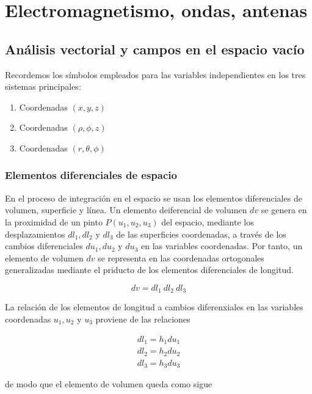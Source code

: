 \chapter{Electromagnetismo, ondas, antenas}

\section{Análisis vectorial y campos en el espacio vacío}

Recordemos los símbolos empleados para las variables independientes en los tres sistemas principales:

\begin{enumerate}
    \item Coordenadas $(x,y,z)$
    \item Coordenadas $(\rho, \phi, z)$
    \item Coordenadas $(r, \theta, \phi)$
\end{enumerate}

\subsection{Elementos diferenciales de espacio}

En el proceso de integración en el espacio se usan los elementos diferenciales de volumen, superficie y línea. Un elemento deiferencial de volumen $dv$ se genera en la proximidad de un pinto $P(u_1,u_2,u_3)$ del espacio, mediante los desplazamientos $dl_1, dl_2$ y $dl_3$ de las superficies coordenadas, a través de los cambios diferenciales $du_1, du_2$ y $du_3$ en las variables coordenadas. Por tanto, un elemento de volumen $dv$ se representa en las coordenadas ortogonales generalizadas mediante el priducto de los elementos diferenciales de longitud.

\begin{equation*}
dv = dl_1 \ dl_2 \ dl_3
\end{equation*}

La relación de los elementos de longitud a cambios diferenxiales en las variables coordenadas $u_1, u_2$ y $u_3$ proviene de las relaciones  

\begin{eqnarray*}
dl_1 = h_1 du_1 \\
dl_2 = h_2 du_2 \\
dl_3 = h_3 du_3
\end{eqnarray*}

de modo que el elemento de volumen queda como sigue

